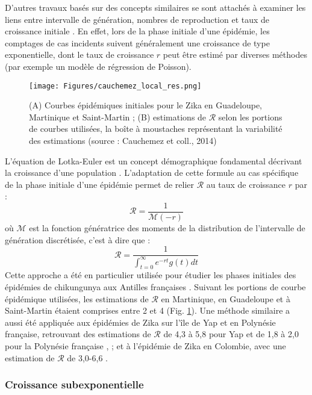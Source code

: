 D'autres travaux basés sur des concepts similaires se sont attachés à examiner les liens entre intervalle de génération, nombres de reproduction et taux de croissance initiale \cite{wallinga_how_2007}.
En effet, lors de la phase initiale d'une épidémie, les comptages de cas incidents suivent généralement une croissance de type exponentielle, dont le taux de croissance $r$ peut être estimé par diverses méthodes (par exemple un modèle de régression de Poisson).
\begin{figure}[t]
	\centering
	\texttt{[image: Figures/cauchemez\_local\_res.png]}
	\caption{(A) Courbes épidémiques initiales pour le Zika en Guadeloupe, Martinique et Saint-Martin ; (B) estimations de $\mathcal{R}$ selon les portions de courbes utilisées, la boîte à moustaches représentant la variabilité des estimations (source : Cauchemez et coll., 2014)}
	\label{fig:cauchemez_local_res}
\end{figure}
L'équation de Lotka-Euler est un concept démographique fondamental décrivant la croissance d'une population \cite{dublin1925true}.
L'adaptation de cette formule au cas spécifique de la phase initiale d'une épidémie permet de relier $\mathcal{R}$ au taux de croissance $r$ par :
\begin{equation}
\mathcal{R} = \frac{1}{\mathcal{M}(-r)}
\end{equation}
où $\mathcal{M}$ est la fonction génératrice des moments de la distribution de l'intervalle de génération discrétisée, c'est à dire que :
\begin{equation}
\mathcal{R} = \frac{1}{\int_{t=0}^{\infty}e^{-rt}g(t)dt}
\end{equation}
Cette approche a été en particulier utilisée pour étudier les phases initiales des épidémies de chikungunya aux Antilles françaises \cite{cauchemez2014local}.
Suivant les portions de courbe épidémique utilisées, les estimations de $\mathcal{R}$ en Martinique, en Guadeloupe et à Saint-Martin étaient comprises entre 2 et 4 (Fig. \ref{fig:cauchemez_local_res}).
Une méthode similaire a aussi été appliquée aux épidémies de Zika sur l'île de Yap et en Polynésie française, retrouvant des estimations de $\mathcal{R}$ de 4,3 à 5,8 pour Yap et de 1,8 à 2,0 pour la Polynésie française \cite{nishiura2016transmission}, ; et à l'épidémie de Zika en Colombie, avec une estimation de $\mathcal{R}$ de 3,0-6,6 \cite{nishiura2016preliminary}.

\subsubsection{Croissance subexponentielle}

